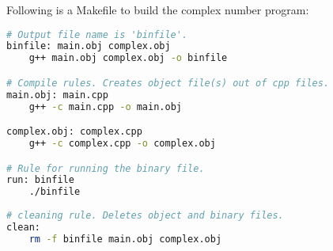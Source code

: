 \documentclass[12pt,a4paper]{article}
\begin{document}
Following is a Makefile to build the complex number program:
\begin{lstlisting}[language=bash,caption={Makefile for Complex Number Program}]
# Output file name is 'binfile'.
binfile: main.obj complex.obj
	g++ main.obj complex.obj -o binfile

# Compile rules. Creates object file(s) out of cpp files.
main.obj: main.cpp
	g++ -c main.cpp -o main.obj

complex.obj: complex.cpp
	g++ -c complex.cpp -o complex.obj

# Rule for running the binary file.
run: binfile
	./binfile
	
# cleaning rule. Deletes object and binary files.
clean:
	rm -f binfile main.obj complex.obj
\end{lstlisting}
%
%
\end{document}

